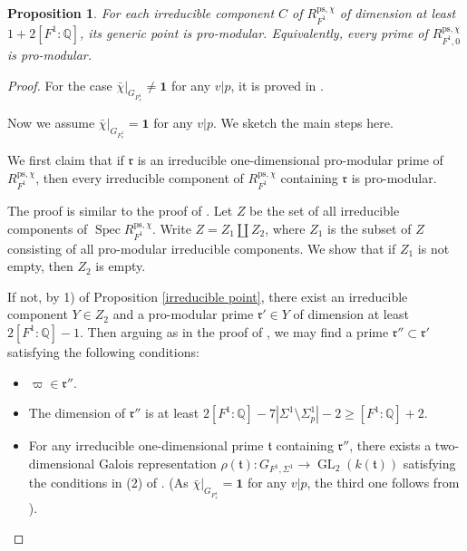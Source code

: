 \documentclass[a4paper, 12pt]{amsart}
\newtheorem{prop}[thm]{Proposition}
\DeclareMathOperator{\Spec}{Spec}
\def\ps{\mathrm{ps}}
\newcommand{\Q}{\mathbb{Q}}
\begin{document}
    \begin{prop} \label{potential R=T}
    	For each irreducible component $C$ of $R_{F^1}^{\ps, \chi} $ of dimension at least $1+2[F^1:\Q] $, its generic point is pro-modular. Equivalently, every prime of $R_{F^1,0}^{\ps, \chi}$ is pro-modular.
    \end{prop}
    
    \begin{proof}
    	For the case $\bar{\chi}|_{G_{F^1_v}} \ne \mathbf{1}$ for any $v|p$,  it is proved in \cite[Theorem 5.5.1]{Zhang:2024aa}.
    	
    	Now we assume $\bar{\chi}|_{G_{F^1_v}} = \mathbf{1}$ for any $v|p$. We sketch the main steps here.
    	
    	We first claim that if $\mathfrak{r}$ is an irreducible one-dimensional pro-modular prime  of $R_{F^1}^{\ps, \chi} $, then every irreducible component of $R_{F^1}^{\ps, \chi} $ containing $\mathfrak{r}$ is pro-modular.
    	
    	The proof is similar to the proof of \cite[Proposition 4.1.5]{Zhang:2024ab}. Let $Z$ be the set of all irreducible components of $\Spec R_{F^1}^{\ps, \chi}$. Write $Z= Z_1 \amalg Z_2$, where $Z_1$ is the subset of $Z$ consisting of all pro-modular irreducible components. We show that if $Z_1$ is not empty, then $Z_2$ is empty.
    	
    	If not, by 1) of Proposition \ref{irreducible point}, there exist an irreducible component $Y \in Z_2$ and a pro-modular prime $\mathfrak{r}' \in Y$ of dimension at least $2[F^1: \mathbb{Q}]-1$. Then arguing as in the proof of \cite[Proposition 4.1.5]{Zhang:2024ab}, we may find a prime $\mathfrak{r}'' \subset \mathfrak{r}'$ satisfying the following conditions:
    	\begin{itemize}
    		\item $\varpi \in \mathfrak{r}''$.
    		\item  The dimension of $\mathfrak{r}'' $ is at least $ 2[F^1: \mathbb{Q}]-7|\Sigma^1\setminus\Sigma^1_p|-2 \ge [F^1: \mathbb{Q}]+2$.
    		\item  For any irreducible one-dimensional prime $\mathfrak{t}$ containing $\mathfrak{r}''$, there exists a two-dimensional Galois representation $\rho(\mathfrak{t}) : G_{F^1, \Sigma^1} \to \operatorname{GL}_2(k(\mathfrak{t}))$ satisfying the conditions in (2) of \cite[Definition 4.1.1]{pan2022fontaine}. (As $\bar{\chi}|_{G_{F^1_v}} = \mathbf{1}$ for any $v|p$, the third one follows from \cite[Lemma 4.1.6 (2)]{pan2022fontaine}).
    	\end{itemize}
    	

\end{proof}
\end{document}
